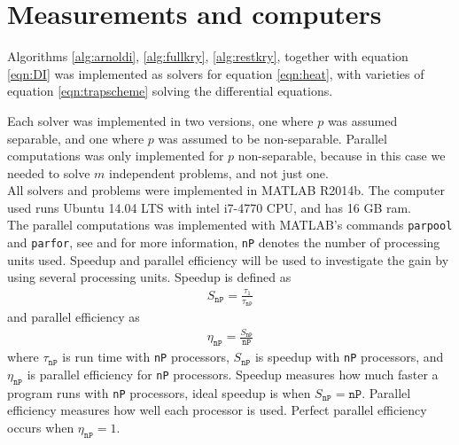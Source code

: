\section{Measurements and computers} \label{sec:not}
Algorithms \ref{alg:arnoldi}, \ref{alg:fullkry}, \ref{alg:restkry}, together with equation \ref{eqn:DI} was implemented as solvers for equation \ref{eqn:heat}, with varieties of equation \ref{eqn:trapscheme} solving the differential equations. 

Each solver was implemented in two versions, one where $p$ was assumed separable, and one where $p$ was assumed to be non-separable. Parallel computations was only implemented for $p$ non-separable, because in this case we needed to solve $m$ independent problems, and not just one.\\ %

All solvers and problems were implemented in MATLAB R2014b. The computer used runs Ubuntu 14.04 LTS with intel  i7-4770 CPU, and has 16 GB ram. \\

The parallel computations was implemented with MATLAB's commands \texttt{parpool} and \texttt{parfor}, see \cite{parpool} and \cite{parfor} for more information, \texttt{nP} denotes the number of processing units used. Speedup and parallel efficiency will be used to investigate the gain by using several processing units. Speedup is defined as
\begin{align*}
S_\texttt{nP} = \frac{\tau_1}{\tau_\texttt{nP}}
\end{align*}
and parallel efficiency as
\begin{align*}
\eta_\texttt{nP} = \frac{S_\texttt{nP}}{\texttt{nP}}
\end{align*}
where $\tau_\texttt{nP}$ is run time with \texttt{nP} processors, $S_\texttt{nP}$ is speedup with \texttt{nP} processors, and $\eta_\texttt{nP}$ is parallel efficiency for \texttt{nP} processors. Speedup measures how much faster a program runs with \texttt{nP} processors, ideal speedup is when $S_\texttt{nP} = \texttt{nP}$. Parallel efficiency measures how well each processor is used. Perfect parallel efficiency occurs when $\eta_\texttt{nP} = 1$.\\

